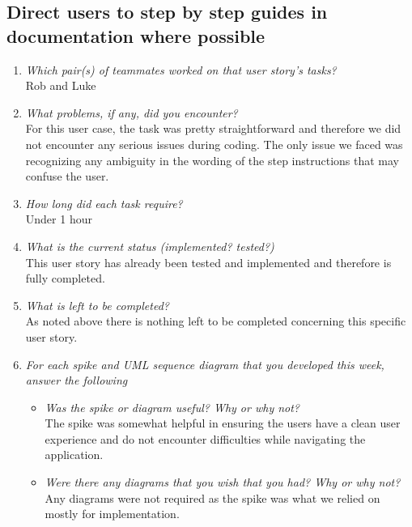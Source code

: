 \documentclass[12pt, letterpaper]{article}
\begin{document}
   \subsection{Direct users to step by step guides in documentation where possible}
   \begin{enumerate}
   	\item \emph{Which pair(s) of teammates worked on that user story's tasks?}
   	\\Rob and Luke
   	\item \emph{What problems, if any, did you encounter?}
   	\\For this user case, the task was pretty straightforward and therefore we did not encounter any serious issues during coding.  The only issue we faced was recognizing any ambiguity in the wording of the step instructions that may confuse the user.
   	\item \emph{How long did each task require?}
   	\\Under 1 hour
   	\item \emph{What is the current status (implemented? tested?)}
   	\\This user story has already been tested and implemented and therefore is fully completed.
   	\item \emph{What is left to be completed?}
   	\\As noted above there is nothing left to be completed concerning this specific user story.
   	\item \emph{For each spike and UML sequence diagram that you developed this week, answer the following}
   	\begin{itemize}
   		\item \emph{Was the spike or diagram useful? Why or why not?}
   		\\The spike was somewhat helpful in ensuring the users have a clean user experience and do not encounter difficulties while navigating the application.
   		\item \emph{Were there any diagrams that you wish that you had? Why or why not?}
   		\\Any diagrams were not required as the spike was what we relied on mostly for implementation.
   	\end{itemize}
   \end{enumerate}
\end{document}
